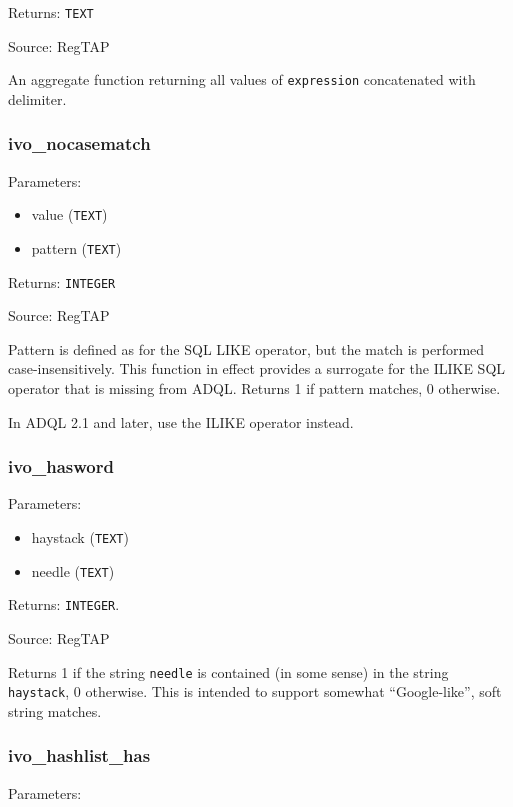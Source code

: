 \documentclass[11pt,a4paper]{ivoa}
\begin{document}
Returns: \texttt{TEXT}

Source: RegTAP \citep{2014ivoa.spec.1208D}

An aggregate function returning all values of \texttt{expression} 
concatenated with delimiter.

\subsubsection{ivo\_nocasematch}

Parameters:

\begin{itemize}
	\item value (\texttt{TEXT})
	\item pattern (\texttt{TEXT})
\end{itemize}

Returns: \texttt{INTEGER}

Source: RegTAP \citep{2014ivoa.spec.1208D}

Pattern is defined as for the SQL LIKE operator, but the match is
performed case-insensitively. This function in effect provides a
surrogate for the ILIKE SQL operator that is missing from ADQL. Returns
1 if pattern matches, 0 otherwise.

In ADQL 2.1 and later, use the ILIKE operator instead.

\subsubsection{ivo\_hasword}

Parameters:

\begin{itemize}
	\item haystack (\texttt{TEXT})
	\item needle (\texttt{TEXT})
\end{itemize}

Returns: \texttt{INTEGER}.

Source: RegTAP \citep{2014ivoa.spec.1208D}

Returns 1 if the string \texttt{needle} is contained (in some sense) in
the string \texttt{haystack}, 0 otherwise.  This is intended to support
somewhat ``Google-like'', soft string matches.

\subsubsection{ivo\_hashlist\_has}

Parameters:
\end{document}
